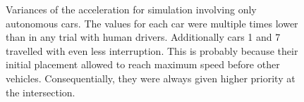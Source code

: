 \documentclass[11pt,english,twoside]{article}
\begin{document}
\begin{figure}[!] %
\caption{Variances of the acceleration for simulation involving only autonomous cars. The values for each car were multiple times lower than in any trial with human drivers. Additionally cars 1 and 7 travelled with even less interruption. This is probably because their initial placement allowed to reach maximum speed before other vehicles. Consequentially, they were always given higher priority at the intersection.}
\label{fig:acc_autonomous_only_var}
\end{figure} 


\begin{figure}[!] %
\caption{}
\label{fig:equilibrum}
\end{figure} 







\end{document}
